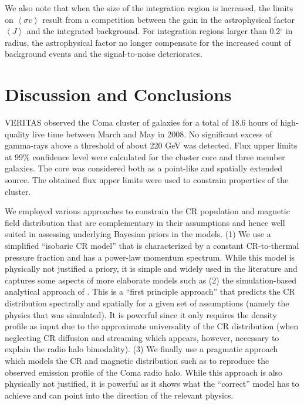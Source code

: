 \documentclass[12pt,manuscript]{aastex}
\newcommand{\expval}[1]{\left\langle #1 \right\rangle}
\begin{document}
We also note that when the size of the integration region is increased, the limits on $\expval{\sigma v}$
result from a competition between the gain in the astrophysical factor $\expval{J}$ and the integrated
background. For integration regions larger than 0.2$^{\circ}$ in radius, the astrophysical factor
no longer compensate for the increased count of background events and the signal-to-noise
deteriorates. 



%
%

\section{Discussion and Conclusions}
VERITAS observed the Coma cluster of galaxies for a total of 18.6 hours of high-quality live time
between March and May in 2008. No significant excess of gamma-rays above a threshold of about 220
GeV was detected. Flux upper limits at 99\% confidence level were calculated for the cluster core
and three member galaxies. The core was considered both as a point-like and spatially extended
source. The obtained flux upper limits were used to constrain properties of the cluster.

We employed various approaches to constrain the CR population and magnetic field distribution that
are complementary in their assumptions and hence well suited in assessing underlying Bayesian
priors in the models. (1) We use a simplified ``isobaric CR model'' that is characterized by a
constant CR-to-thermal pressure fraction and has a power-law momentum spectrum.  While this model
is physically not justified a priory, it is simple and widely used in the literature and captures
some aspects of more elaborate models such as (2) the simulation-based analytical approach of
\citet{article:PinzkePfrommer:2010}. This is a ``first principle approach'' that predicts the CR
distribution spectrally and spatially for a given set of assumptions (namely the physics that was
simulated). It is powerful since it only requires the density profile as input due to the
approximate universality of the CR distribution (when neglecting CR diffusion and streaming which
appears, however, necessary to explain the radio halo bimodality). (3) We finally use a pragmatic
approach which models the CR and magnetic distribution such as to reproduce the observed emission
profile of the Coma radio halo. While this approach is also physically not justified, it is
powerful as it shows what the ``correct'' model has to achieve and can point into the direction of
the relevant physics.
\end{document}
